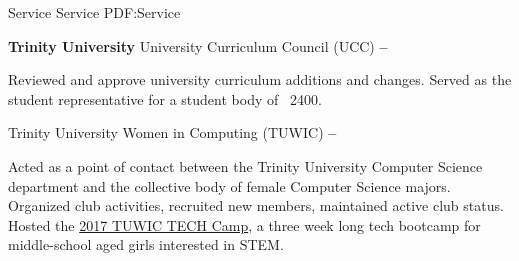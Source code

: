 \Section
{Service}
{Service}
{PDF:Service}

\Entry
\textbf{Trinity University}
\SubEntry
\Gap
University Curriculum Council (UCC)
\dotfill
\textbf{ -- }
\begin{Detail}
    \SubBulletItem
    Reviewed and approve university curriculum additions and changes.
    \SubBulletItem
    Served as the student representative for a student body of ~2400.
\end{Detail}

\SubEntry
\Gap
Trinity University Women in Computing (TUWIC)
\dotfill
\textbf{ -- }
\begin{Detail}
    \SubBulletItem
    Acted as a point of contact between the Trinity University Computer Science department and the collective body of female Computer Science majors.
    \SubBulletItem
    Organized club activities, recruited new members, maintained active club status.
    \SubBulletItem
    Hosted the \href{http://www.cs.trinity.edu/~tuwic/TECHcamp/}{2017 TUWIC TECH Camp}, a three week long tech bootcamp for middle-school aged girls interested in STEM.
\end{Detail}
